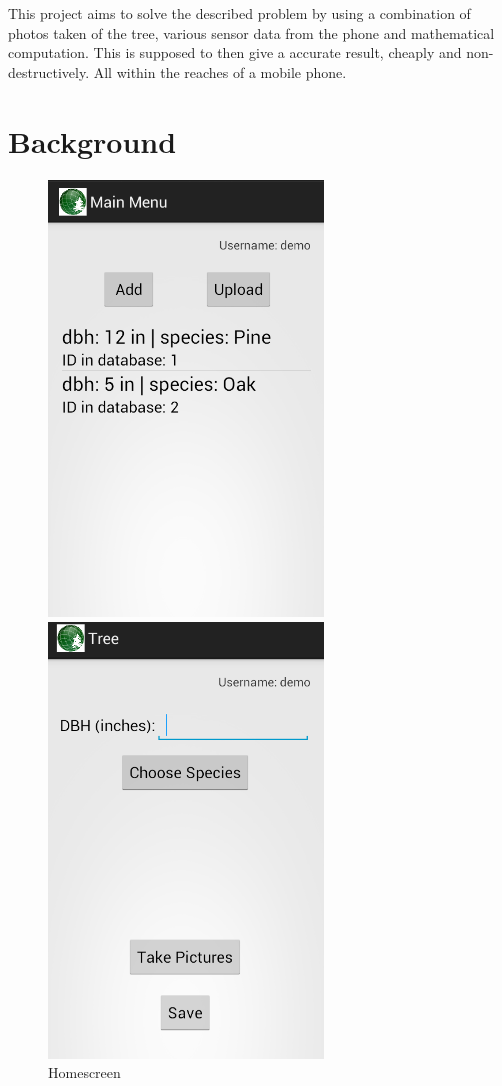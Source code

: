 This project aims to solve the described problem by using a combination of 
photos taken of the tree, various sensor data from the phone and mathematical 
computation. This is supposed to then give a accurate result, cheaply and 
non-destructively. All within the reaches of a mobile phone.

\section{Background}

\begin{figure}[!htb]
		\centering
  		\includegraphics[width=0.65\textwidth]{main.png}
	  	\caption{Homescreen}
  		\label{main}
	\endminipage\hfill
		\centering
	  	\includegraphics[width=0.65\textwidth]{input.png}

\end{figure}
